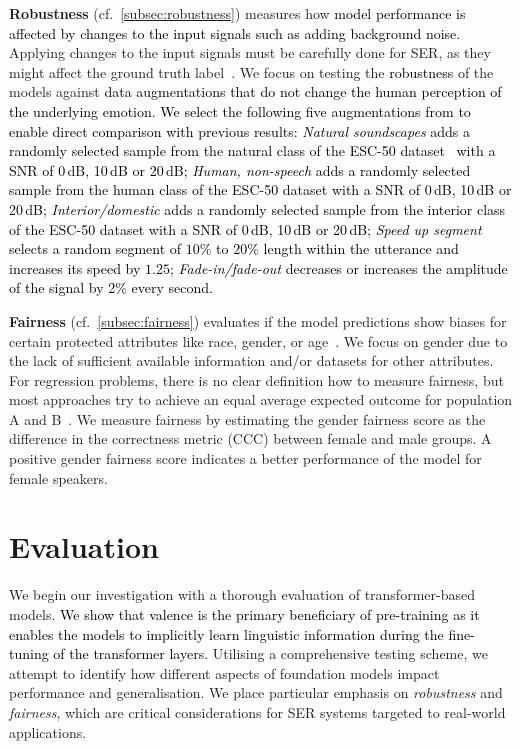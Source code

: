 \documentclass{article}
\newcommand{\review}[1]{\textcolor{black}{#1}}
\newcommand{\cf}{{cf.\ }}
\begin{document}
\textbf{Robustness} (\cf \cref{subsec:robustness})
measures how
\review{
model performance is affected by changes
to the input signals
such as adding background noise.
}
Applying changes to the input signals 
must be carefully done for \ac{SER},
as they might affect the ground truth label~\citep{jaiswal2021robustness,parada2017augmentation}.
We focus on testing the \review{robustness} of the models
against
\review{
data augmentations
that 
do not change the human perception
of the underlying emotion.
We select the following five augmentations 
from \citet{jaiswal2021robustness}
to enable direct comparison with previous results:
\emph{Natural soundscapes} adds a randomly selected sample
from the natural class of the ESC-50 dataset~\citep{piczak2015dataset}
with a \ac{SNR} of 0\,dB, 10\,dB or 20\,dB;
\emph{Human, non-speech} adds a randomly selected sample
from the human class of the ESC-50 dataset
with a \ac{SNR} of 0\,dB, 10\,dB or 20\,dB;
\emph{Interior/domestic} adds a randomly selected sample
from the interior class of the ESC-50 dataset
with a \ac{SNR} of 0\,dB, 10\,dB or 20\,dB;
\emph{Speed up segment} selects a random segment of $10$\% to $20$\% length
within the utterance
and increases its speed by $1.25$;
\emph{Fade-in/fade-out} decreases or increases the amplitude
of the signal by 2\% every second.
}

\textbf{Fairness} (\cf \cref{subsec:fairness})
evaluates if the model predictions show biases
for certain protected attributes like race, gender, or age~\citep{corbett-davies2018fairness}.
We focus on gender
due to the lack of sufficient available information and/or datasets for other attributes.
For regression problems,
there is no clear definition how to measure fairness,
but most approaches try to achieve an equal average
expected outcome for population A and B~\citep{fitzsimons2019fairness}.
We measure fairness by estimating the gender fairness score as the difference in the correctness metric (CCC) between female and male groups.
A positive gender fairness score indicates a better performance of the model for female speakers.




\section{Evaluation}
\label{sec:evaluation}

We begin our investigation with a thorough evaluation of transformer-based models.
\review{We show that valence is the primary beneficiary of pre-training as it enables the models to implicitly learn linguistic information during the fine-tuning of the transformer layers.}
Utilising a comprehensive testing scheme,
we attempt to identify how different aspects of foundation models
impact performance and generalisation.
We place particular emphasis on \emph{robustness} and \emph{fairness},
which are critical considerations for \ac{SER} systems targeted to real-world applications.
\end{document}
